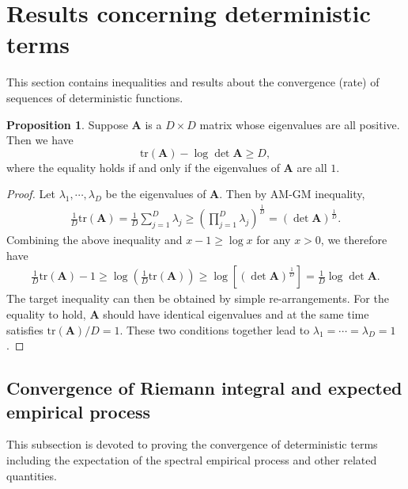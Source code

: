 \documentclass[11pt]{article}
\numberwithin{equation}{section}
\theoremstyle{plain}
\theoremstyle{definition}
\theoremstyle{definition}
\theoremstyle{assumption}
\theoremstyle{proposition}
\newtheorem{proposition}{Proposition}[section]
\theoremstyle{proposition}
\theoremstyle{example}
\theoremstyle{lemma}
\theoremstyle{theorem}
\theoremstyle{remark}
\begin{document}
\section{Results concerning deterministic terms}\label{deterministic_sect}
This section contains inequalities and results about the convergence (rate) of sequences of deterministic functions.
\begin{proposition}\label{proposition_log_trace_ineq}
Suppose $\boldsymbol{A}$ is a $D\times D$ matrix whose eigenvalues are all positive. Then we have
\begin{equation*}
\mathrm{tr}(\boldsymbol{A}) - \log\det\boldsymbol{A} \geqslant D,
\end{equation*}
where the equality holds if and only if the eigenvalues of $\boldsymbol{A}$ are all $1$.
\begin{proof}
Let $\lambda_1,\cdots,\lambda_{D}$ be the eigenvalues of $\boldsymbol{A}$. Then by AM-GM inequality,
\begin{align*}
\frac{1}{D}\mathrm{tr}(\boldsymbol{A})
= \frac{1}{D}\sum_{j=1}^D \lambda_j 
\geqslant \left(\prod_{j=1}^D \lambda_j\right)^{\frac{1}{D}}
=(\det\boldsymbol{A})^{\frac{1}{D}}.
\end{align*}
Combining the above inequality and $x-1\geqslant\log x$ for any $x>0$, we therefore have
\begin{align*}
\frac{1}{D}\mathrm{tr}(\boldsymbol{A}) - 1
\geqslant \log\left(\frac{1}{D}\mathrm{tr}(\boldsymbol{A})\right)
\geqslant \log\left[(\det\boldsymbol{A})^{\frac{1}{D}}\right]
=\frac{1}{D}\log\det\boldsymbol{A} .
\end{align*}
The target inequality can then be obtained by simple re-arrangements. For the equality to hold, $\boldsymbol{A}$ should have identical eigenvalues and at the same time satisfies $\mathrm{tr}(\boldsymbol{A})/D = 1$. These two conditions together lead to $\lambda_1=\cdots=\lambda_D=1$.

\end{proof}
\end{proposition}


\subsection{Convergence of Riemann integral and expected empirical process}\label{consistency_sect}
This subsection is devoted to proving the convergence of deterministic terms including the expectation of the spectral empirical process and other related quantities.
\end{document}
